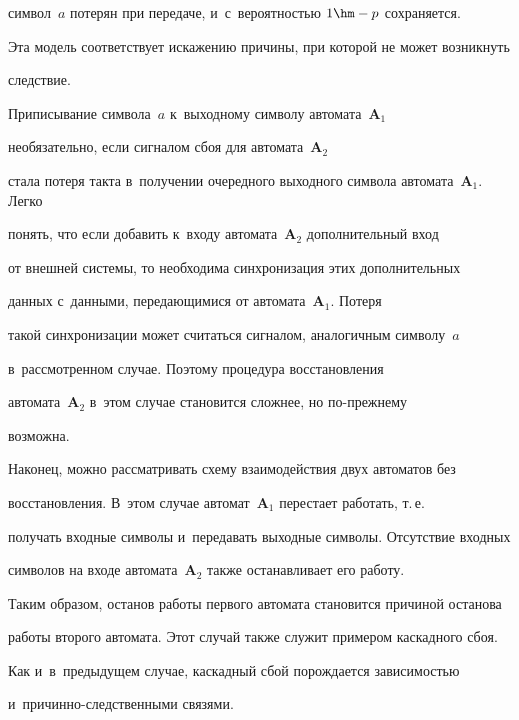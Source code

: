 символ~$a$ потерян при передаче, и~с~ве\-ро\-ят\-ностью $1\hm-p$ сохраняется. 


Эта модель соответствует искажению причины, при которой не может возникнуть 


следствие. 


  


  Приписывание символа~$a$ к~выходному символу автомата~\textbf{A}$_1$ 


  необязательно, если сигналом сбоя для автомата~\textbf{A}$_2$ 


стала потеря так\-та в~получении очередного выходного символа автомата~\textbf{A}$_1$. Легко 


понять, что если добавить к~входу автомата~\textbf{A}$_2$ дополнительный вход 


от внеш\-ней сис\-те\-мы, то необходима синхронизация этих дополнительных 


данных с~данными, пе\-ре\-да\-ющи\-ми\-ся от автомата~\textbf{A}$_1$. Потеря 


такой синхронизации может считаться сигналом, аналогичным символу~$a$ 


в~рассмотренном случае. Поэтому процедура вос\-ста\-нов\-ле\-ния 


автомата~\textbf{A}$_2$ в~этом случае становится сложнее, но по-преж\-не\-му 


воз\-можна.


  


  Наконец, можно рассматривать схему взаимодействия двух автоматов без 


вос\-ста\-нов\-ле\-ния. В~этом случае автомат~\textbf{A}$_1$ перестает работать, т.\,е.\ 


получать вход\-ные символы и~передавать выходные символы. Отсутствие вход\-ных 


символов на входе автомата~\textbf{A}$_2$ так\-же останавливает его работу. 


Таким образом, останов работы первого автомата становится причиной останова 


работы второго автомата. Этот случай так\-же служит примером каскадного сбоя. 


Как и~в~предыду\-щем случае, каскадный сбой по\-рож\-да\-ет\-ся за\-ви\-си\-мостью  


и~при\-чин\-но-след\-ст\-вен\-ны\-ми свя\-зями.





